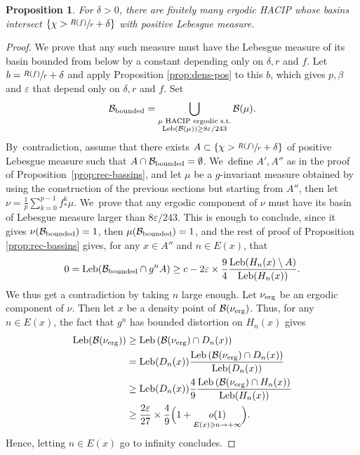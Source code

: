 \documentclass[JEP,XML,SOM,Unicode,NoFloatCountersInSection,published]{cedram}
\newcommand{\erg}{\textup{erg}}
\DeclareMathOperator{\Leb}{Leb}
\newtheorem{prop}[thm]{Proposition}
\theoremstyle{definition}
\begin{document}
\begin{prop}
\label{prop:fini}
For $\delta > 0$, there are finitely many ergodic HACIP whose basins intersect $\left \{ \chi > \sfrac{R(f)}{r} + \delta\right\}$ with positive Lebesgue measure.
\end{prop}

\begin{proof}
We prove that any such measure must have the Lebesgue measure of its basin bounded from below by a constant depending only on $\delta, r$ and $f$.
Let $b = \sfrac{R(f)}{r} + \delta$ and apply Proposition \ref{prop:dens-pos} to this $b$, which gives $p, \beta$ and $\varepsilon$ that depend only on $\delta, r$ and $f$. Set
\[
\mathcal{B}_{\textup{bounded}} = \bigcup_{
\substack{
\mu \text{ HACIP ergodic s.t.}\\
\Leb(\mathcal{B}(\mu)) \geq 8 \varepsilon / 243
}} \mathcal{B}(\mu).
\]
By~contradiction, assume that there exists $A \subset \left \{ \chi > \sfrac{R(f)}{r} + \delta\right\}$ of positive Lebesgue measure such that $A \cap \mathcal{B}_{\textup{bounded}} = \emptyset$. We~define $A', A''$ as in the proof of Proposition~\ref{prop:rec-bassins}, and let $\mu$ be a $g$-invariant measure obtained by using the construction of the previous sections but starting from $A''$, then let $\nu = \frac{1}{p}\sum_{k=0}^{p-1} f^k_* \mu$. We~prove that any ergodic component of $\nu$ must have its basin of Lebesgue measure larger than ${8 \varepsilon}/{243}$.
This is enough to conclude, since it gives $\nu(\mathcal{B}_{\textup{bounded}}) = 1$, then $\mu(\mathcal{B}_{\textup{bounded}}) = 1$, and the rest of proof of Proposition \ref{prop:rec-bassins} gives, for any $x \in A''$ and $n \in E(x)$, that
\[
0 = \Leb(\mathcal{B}_{\textup{bounded}} \cap g^n A) \geq c - 2 \varepsilon \times \frac{9}{4} \frac{\Leb(H_n(x) \setminus A)}{\Leb(H_n(x))}.
\]
We thus get a contradiction by taking $n$ large enough.
Let $\nu_{\erg}$ be an ergodic component of $\nu$.
Then let $x$ be a density point of $\mathcal{B}(\nu_{\erg})$.
Thus, for any $n \in E(x)$, the fact that $g^n$ has bounded distortion on $H_n(x)$ gives
\begin{align*}
\Leb(\mathcal{B}(\nu_{\erg})) &\geq \Leb\left (\mathcal{B}(\nu_{\erg}) \cap D_n(x) \right)\\
&= \Leb (D_n(x)) \frac{\Leb\left (\mathcal{B}(\nu_{\erg}) \cap D_n(x) \right)}{\Leb (D_n(x))}\\
&\geq \Leb (D_n(x)) \frac{4}{9} \frac{\Leb \left (\mathcal{B}(\nu_{\erg}) \cap H_n(x) \right)}{\Leb(H_n(x))}\\
&\geq \frac{2 \varepsilon}{27} \times \frac{4}{9} \Bigl (1 + \underset{E(x) \ni n\to +\infty}{o(1)} \Bigr).
\end{align*}
Hence, letting $n \in E(x)$ go to infinity concludes.
\end{proof}
\end{document}
